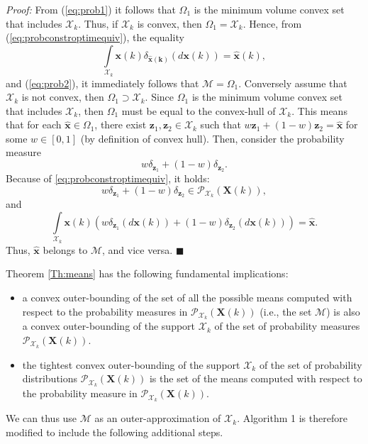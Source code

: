 \documentclass[twocolumn]{autart}
\newenvironment*{proof}{\emph{Proof:}}{}
\newcommand{\DP}[1]{{#1}}
\begin{document}
 \begin{proof}
  From (\ref{eq:prob1}) it follows  that $\Omega_1$ is the minimum volume
  convex set that includes $\mathcal{X}_k$.
  Thus, if $\mathcal{X}_k$ is convex, then $\Omega_1=\mathcal{X}_k$.
  Hence, from (\ref{eq:probconstroptimequiv}), the equality
  $$
 \int\limits_{\mathcal{X}_k}  \mathbf{x}(k) \delta_{\mathbf{\hat{x}(k)}}(d\mathbf{x}(k)) =\hat{\mathbf{x}}(k),
  $$
 and (\ref{eq:prob2}),  it   immediately follows that $\mathcal{M}=\Omega_1$.
  Conversely assume that $\mathcal{X}_k$ is not convex, then $\Omega_1 \supset \mathcal{X}_k$.
    Since $\Omega_1$ is the minimum volume   convex set that includes $\mathcal{X}_k$, then
    $\Omega_1$ must be equal to the convex-hull of $\mathcal{X}_k$.
  This means that for each $\hat{\mathbf{x}} \in \Omega_1$, there exist
  $\mathbf{z}_1,\mathbf{z}_2 \in \mathcal{X}_k$ such that $w\mathbf{z}_1+(1-w)\mathbf{z}_2=\hat{\mathbf{x}}$
  for some $w \in [0,1]$ (by definition of convex hull).
    Then, consider the probability measure
  \begin{equation}
  w\delta_{\mathbf{z}_1}+(1-w)\delta_{\mathbf{z}_2}.
  \end{equation}
  Because of \eqref{eq:probconstroptimequiv}, it holds:
    \begin{equation}
  w\delta_{\mathbf{z}_1}+(1-w)\delta_{\mathbf{z}_2} \in \mathcal{P}_{\mathcal{X}_k}(\mathbf{X}(k)),
  \end{equation}
  and
   \begin{equation}
 \int\limits_{\mathcal{X}_k}  \mathbf{x}(k) \left(w\delta_{\mathbf{z}_1}(d \mathbf{x}(k))+(1-w)\delta_{\mathbf{z}_2}(d \mathbf{x}(k))\right)=\hat{\mathbf{x}}.
  \end{equation}
  Thus, $\hat{\mathbf{x}}$ belongs to $\mathcal{M}$, and vice versa.
\hfill $\blacksquare$
  \end{proof}

Theorem \ref{Th:means} has the following fundamental implications:
\begin{itemize}
 \item a convex outer-bounding of the set of all the possible means computed \DP{with respect to} the probability measures in $\mathcal{P}_{\mathcal{X}_k}(\mathbf{X}(k))$ (i.e., the set $\mathcal{M}$) is also a convex outer-bounding of the support $\mathcal{X}_k$ of the set of probability measures $\mathcal{P}_{\mathcal{X}_k}(\mathbf{X}(k))$.
 \item the tightest convex outer-bounding of the support $\mathcal{X}_k$ of the set of probability distributions $\mathcal{P}_{\mathcal{X}_k}(\mathbf{X}(k))$ is the set of the  means computed \DP{with respect to} the probability measure in $\mathcal{P}_{\mathcal{X}_k}(\mathbf{X}(k))$.
 \end{itemize}
 We can thus use $\mathcal{M}$ as an outer-approximation of  $\mathcal{X}_k$. Algorithm 1 is therefore
 modified to include the following additional steps.
\end{document}
